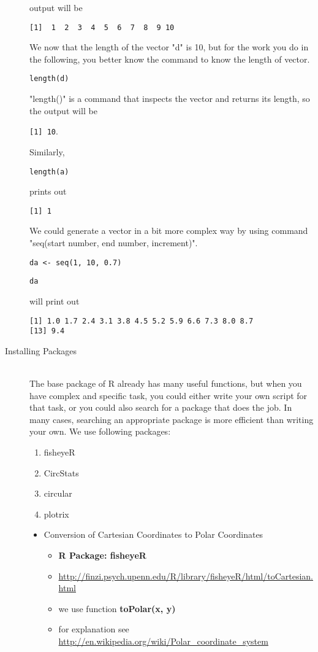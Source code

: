 \documentclass[11pnt]{article}
\begin{document}
\begin{description}
output will be

\verb"[1]  1  2  3  4  5  6  7  8  9 10"

We now that the length of the vector "d" is 10, but for the work you do in the following, you better know the command to know the length of vector.

\verb"length(d)"

"length()" is a command that inspects the vector and returns its length, so the output will be

\verb"[1] 10". 

Similarly, 

\verb"length(a)"

prints out

\verb"[1] 1"

We could generate a vector in a bit more complex way by using command "seq(start number, end number, increment)". 

\verb"da <- seq(1, 10, 0.7)"

\verb"da"

will print out

\begin{verbatim}
[1] 1.0 1.7 2.4 3.1 3.8 4.5 5.2 5.9 6.6 7.3 8.0 8.7
[13] 9.4
\end{verbatim}

\item[Installing Packages]\hfill\\

The base package of R already has many useful functions, but when you have complex and specific task, you could either write your own script for that task, or you could also search for a package that does the job. In many cases, searching an appropriate package is more efficient than writing your own. We use following packages:
\begin{enumerate}
\item fisheyeR
\item CircStats
\item circular
\item plotrix
\end{enumerate}


\begin{itemize}
\item Conversion of Cartesian Coordinates to Polar Coordinates
\begin{itemize}
\item \textbf{R Package: fisheyeR}
\item \url{http://finzi.psych.upenn.edu/R/library/fisheyeR/html/toCartesian.html}
\item we use function \textbf{toPolar(x, y)}
\item for explanation see \url{http://en.wikipedia.org/wiki/Polar\_coordinate\_system}
\end{itemize}
\end{itemize}


\end{description}
\end{document}
